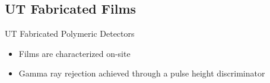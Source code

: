 \subsection{UT Fabricated Films}
\begin{frame}{UT Fabricated Polymeric Detectors}
\label{PHDMain}
  \begin{itemize}
    \item Films are characterized on-site
    \item Gamma ray rejection achieved through a pulse height discriminator
  \end{itemize}

\hyperlink{MeasMethods}{}
\end{frame}
